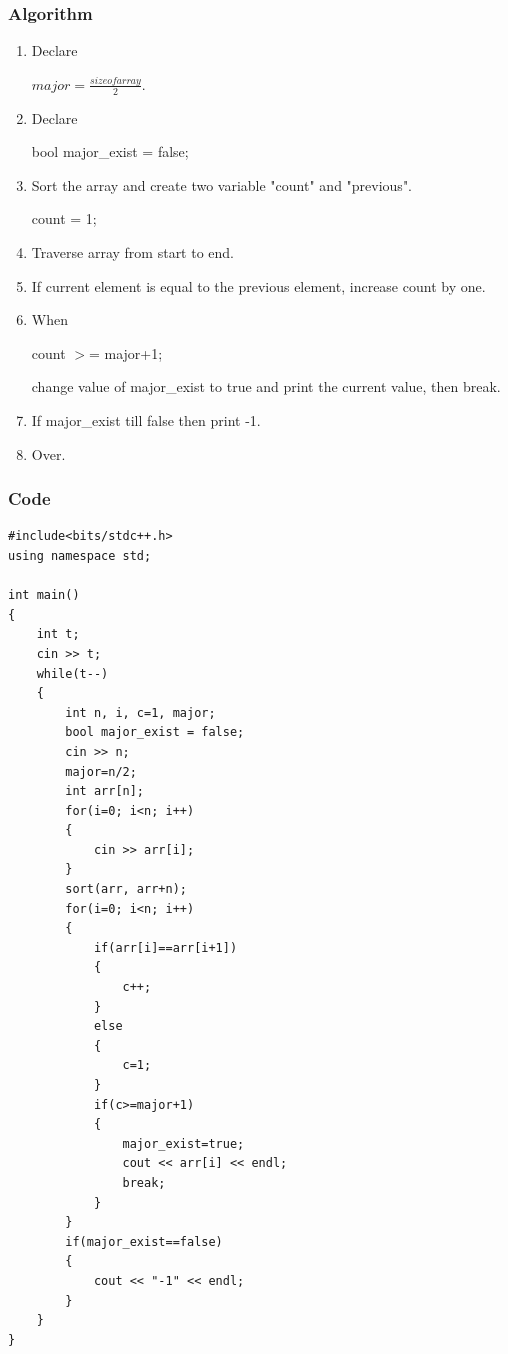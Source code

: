 \documentclass[11 pt]{article}
\begin{document}
\subsubsection{Algorithm}
\begin{tcolorbox}
\begin{enumerate}
 \item Declare \begin{tcolorbox}[colframe=red!50!white]
$major = \frac{size of array}{2}$.
\end{tcolorbox}
 \item Declare \begin{tcolorbox}[colframe=red!50!white]
bool major\_exist = false;
\end{tcolorbox}
 \item Sort the array and create two variable "count" and "previous".\begin{tcolorbox}[colframe=red!50!white]
count = 1;
\end{tcolorbox}
 \item Traverse array from start to end.
 \item If current element is equal to the previous element, increase count by one.
 \item When \begin{tcolorbox}[colframe=red!50!white]
count $>$= major+1;
\end{tcolorbox}
change value of major\_exist to true and print the current value, then break.
 \item If major\_exist till false then print -1.
 \item Over.
\end{enumerate}
\end{tcolorbox}

\pagebreak
\subsubsection{Code}
\begin{lstlisting}[caption=Majority Element $2'nd$ code, frame=shadowbox, rulesepcolor=\color{green!70}]
#include<bits/stdc++.h>
using namespace std;

int main()
{
    int t;
    cin >> t;
    while(t--)
    {
        int n, i, c=1, major;
        bool major_exist = false;
        cin >> n;
        major=n/2;
        int arr[n];
        for(i=0; i<n; i++)
        {
            cin >> arr[i];
        }
        sort(arr, arr+n);
        for(i=0; i<n; i++)
        {
            if(arr[i]==arr[i+1])
            {
                c++;
            }
            else
            {
                c=1;
            }
            if(c>=major+1)
            {
                major_exist=true;
                cout << arr[i] << endl;
                break;
            }
        }
        if(major_exist==false)
        {
            cout << "-1" << endl;
        }
    }
}
\end{lstlisting}
\end{document}
